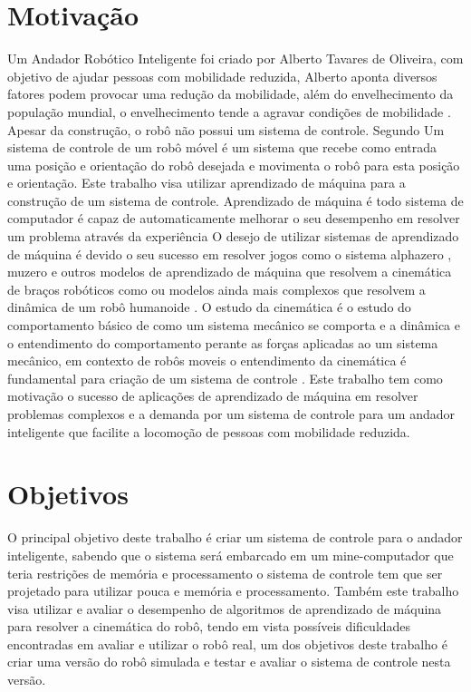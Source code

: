 \label{Cap:Introducao}

\section{Motivação}

Um Andador Robótico Inteligente foi criado por Alberto Tavares de Oliveira,
com objetivo de ajudar pessoas com mobilidade reduzida, Alberto aponta
diversos fatores podem provocar uma redução da mobilidade, além do 
envelhecimento da população mundial, o envelhecimento tende a agravar
condições de mobilidade \cite{oliveira2022projeto}. Apesar da construção,
o robô não possui um sistema de controle. Segundo \cite{siegwart2011introduction}
Um sistema de controle de um robô móvel é um sistema que recebe
como entrada uma posição e orientação do robô desejada e movimenta o robô
para esta posição e orientação. Este trabalho visa utilizar
aprendizado de máquina para a construção de um sistema de controle.
Aprendizado de máquina é todo sistema de computador é capaz de
automaticamente melhorar o seu desempenho em resolver um problema através
da experiência \cite{mitchell1990machine}
O desejo de utilizar sistemas de aprendizado de máquina é devido o seu sucesso em
resolver jogos como o sistema alphazero \cite{silver2017mastering}, muzero
\cite{schrittwieser2020mastering} e outros modelos de aprendizado de máquina
que resolvem a cinemática de braços robóticos como \cite{cavalcanti2017self}
ou modelos ainda mais complexos que resolvem a dinâmica de um robô humanoide
\cite{phaniteja2017deep}. O estudo da cinemática é o estudo do comportamento
básico de como um sistema mecânico se comporta e a dinâmica e o entendimento
do comportamento perante as forças aplicadas ao um sistema mecânico, em contexto
de robôs moveis o entendimento da cinemática é fundamental para criação de um
sistema de controle \cite{siegwart2011introduction}. Este trabalho tem como
motivação o sucesso de aplicações de aprendizado de máquina em resolver problemas
complexos e a demanda por um sistema de controle para um andador
inteligente que facilite a locomoção de pessoas com mobilidade reduzida. 

\section{Objetivos}

O principal objetivo deste trabalho é criar um  sistema de
controle para o andador inteligente, sabendo que o sistema será
embarcado em um mine-computador que teria restrições de memória e
processamento o sistema de controle tem que ser projetado para utilizar
pouca e memória e processamento.
Também este trabalho visa utilizar e avaliar o desempenho de algoritmos
de aprendizado de máquina para resolver a cinemática do robô, tendo em
vista possíveis dificuldades encontradas em avaliar e utilizar o robô real,
um dos objetivos deste trabalho é criar uma versão do robô simulada e
testar e avaliar o sistema de controle nesta versão.

